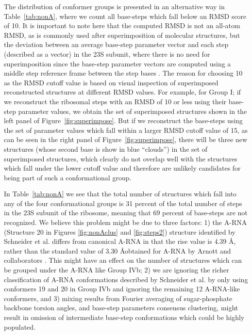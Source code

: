 The distribution  of conformer groups  is presented in  an alternative
way in Table~\ref{tab:nonA}, where  we count all base-steps which fall
below an  RMSD score  of 10.  It  is important  to note here  that the
computed  RMSD is  not an  all-atom RMSD,  as is  commonly  used after
superimposition of molecular structures,  but the deviation between an
average  base-step parameter  vector  and each  step  (described as  a
vector) in the 23S subunit, where there is no need for superimposition
since the base-step parameter vectors are computed using a middle step
reference frame between the  step bases \cite{lu2003}.  The reason for
choosing 10 as the RMSD cutoff  value is based on visual inspection of
superimposed  reconstructed structures at  different RMSD  values. For
example, for  Group I; if we  reconstruct the ribosomal  steps with an
RMSD of 10  or less using their base-step  parameter values, we obtain
the  set  of  superimposed  structures  shown in  the  left  panel  of
Figure~\ref{fig:superimpose}.   But if  we reconstruct  the base-steps
using  the set of  parameter values  which fall  within a  larger RMSD
cutoff  value  of   15,  as  can  be  seen  in   the  right  panel  of
Figure~\ref{fig:superimpose},  there  will  be  three  new  structures
(whose  second  base  is  show  in  blue ``clouds'')  in  the  set  of
superimposed structures,  which clearly do  not overlap well  with the
structures which fall  under the lower cutoff value  and therefore are
unlikely candidates for being part of such a conformational group.
  
In  Table~\ref{tab:nonA} we see  that the  total number  of structures
which fall into any of the four conformational groups is 31 percent of
the total number of steps in  the 23S subunit of the ribosome, meaning
that  69 percent  of base-steps  are not  recognized. We  believe this
problem might be  due to three factors: 1) the  A-RNA (Structure 20 in
Figures \ref{fig:nonAclus}  and \ref{fig:steps2}) structure identified
by Schneider  et al.   differs from canonical  A-RNA in that  the rise
value is 4.39 \AA, rather than the standard value of 3.30 \AA obtained
for A-RNA  by Arnott and collaborators  \cite{arnott1973}.  This might
have an effect on the number  of structures which can be grouped under
the A-RNA like Group IVb; 2) we are ignoring the richer classification
of    A-RNA   conformations    described   by    Schneider    et   al.
\cite{schneider2004} by only  using conformers 19 and 20  in Group IVb
and  ignoring the remaining  12 A-RNA-like  conformers, and  3) mixing
results  from Fourier  averaging of  sugar-phosphate  backbone torsion
angles, and base-step parameters consensus clustering, might result in
omission of intermediate base-step conformations which could be highly
populated.

